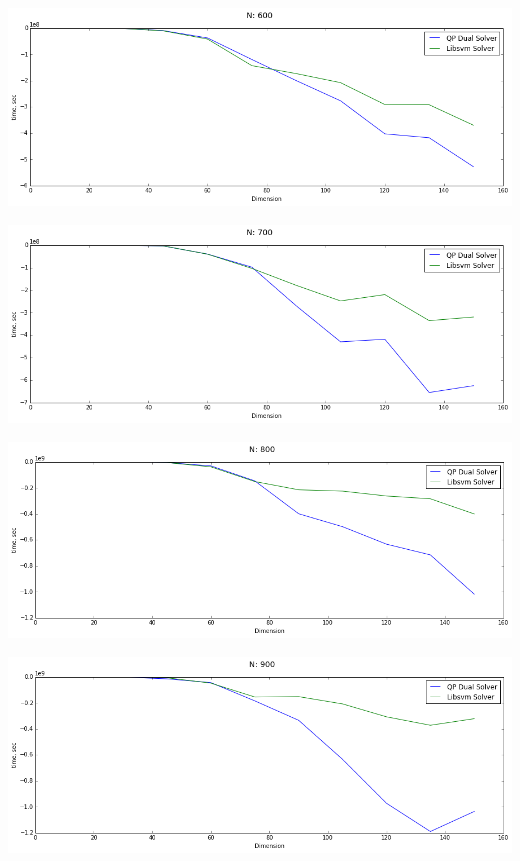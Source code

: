 \documentclass[12pt, a4paper]{article}
\begin{document}
			\begin{center}
				\includegraphics[width=18cm]{2par_obj_N600_one.png}
			\end{center}

			\begin{center}
				\includegraphics[width=18cm]{2par_obj_N700_one.png}
			\end{center}

			\begin{center}
				\includegraphics[width=18cm]{2par_obj_N800_one.png}
			\end{center}

			\begin{center}
				\includegraphics[width=18cm]{2par_obj_N900_one.png}
			\end{center}
\end{document}
